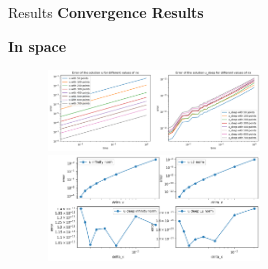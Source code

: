 \begin{frame}{Results}
    \textbf{Convergence Results}
 
    \textbf{In space} 
    \begin{figure}
       \centering
       \includegraphics[width=0.5\textwidth]{images/conv1.png}
       \includegraphics[width=0.5\textwidth]{images/conv2.png}
   \end{figure}
     
 \end{frame}
